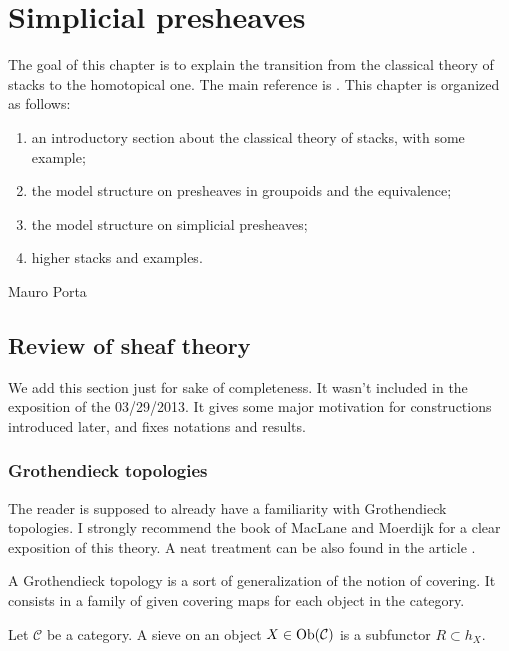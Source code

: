 \chapter{Simplicial presheaves}

\begin{refsection}

The goal of this chapter is to explain the transition from the classical theory of stacks to the homotopical one. The main reference is \cite{hollander}. This chapter is organized as follows:
\begin{enumerate}
\item an introductory section about the classical theory of stacks, with some example;
\item the model structure on presheaves in groupoids and the equivalence;
\item the model structure on simplicial presheaves;
\item higher stacks and examples.
\end{enumerate}

\begin{flushright}
Mauro Porta
\end{flushright}

\section{Review of sheaf theory}

We add this section just for sake of completeness. It wasn't included in the exposition of the 03/29/2013. It gives some major motivation for constructions introduced later, and fixes notations and results.

\subsection{Grothendieck topologies}

The reader is supposed to already have a familiarity with Grothendieck topologies. I strongly recommend the book of MacLane and Moerdijk \cite[Ch. III]{sheaves} for a clear exposition of this theory. A neat treatment can be also found in the article \cite[Ch. II]{vistoli}.

A Grothendieck topology is a sort of generalization of the notion of covering. It consists in a family of given covering maps for each object in the category.

\begin{defin}
Let $\mathcal C$ be a category. A sieve on an object $X \in \mathrm{Ob}(\mathcal C)$ is a subfunctor $R \subset h_X$.
\end{defin}


\end{refsection}
